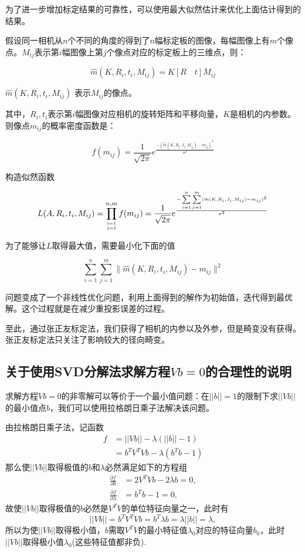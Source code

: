 \documentclass{lzureport}
\begin{document}
为了进一步增加标定结果的可靠性，可以使用最大似然估计来优化上面估计得到的结果。

假设同一相机从$n$个不同的角度的得到了$n$幅标定板的图像，每幅图像上有$m$个像点。$M_{ij}$表示第$i$幅图像上第$j$个像点对应的标定板上的三维点，则：

$$
\hat{m}(K,R_{i},t_{i},M_{ij})=K[R\quad t]M_{ij}
$$

$\hat{m}(K,R_{i},t_{i},M_{ij})$ 表示$M_{ij}$的像点。

其中，$R_{i},t_{i}$表示第$i$幅图像对应相机的旋转矩阵和平移向量，$K$是相机的内参数。则像点$m_{ij}$的概率密度函数是：

$$
f(m_{ij})=\frac{1}{\sqrt{2\pi}}e^{\frac{-(\hat{m}(K,R_i,J_i,M_{ij})-m_{ij})^2}{\sigma^2}}
$$

构造似然函数

$$
L(A,R_i,t_i,M_{ij})=\prod_{i=1\atop j=1}^{n,m}f(m_{ij})=\frac{1}{\sqrt{2\pi}}e^{\frac{-\sum\limits_{i=1}^n\sum\limits_{j=1}^m(\hat{m}(K,R_i,J_i,M_{ij})-m_{ij})^2}{\sigma^2}}
$$

为了能够让$L$取得最大值，需要最小化下面的值

$$
\sum_{i=1}^n\sum_{j=1}^m\|\hat{m}(K,R_i,t_i,M_{ij})-m_{ij}\|^2
$$

问题变成了一个非线性优化问题，利用上面得到的解作为初始值，迭代得到最优解。这个过程就是在减少重投影误差的过程。

至此，通过张正友标定法，我们获得了相机的内参以及外参，但是畸变没有获得。张正友标定法只关注了影响较大的径向畸变。

\subsection{关于使用SVD分解法求解方程$Vb=0$的合理性的说明}
求解方程$Vb=0$的非零解可以等价于一个最小值问题：在$||b||=1$的限制下求$||Vb||$的最小值点$b$，我们可以使用拉格朗日乘子法解决该问题。

由拉格朗日乘子法，记函数
\begin{equation*}
\begin{aligned}
	f&=||Vb||-\lambda(||b||-1)\\
	 &=b^TV^TVb-\lambda(b^Tb-1)
\end{aligned}
\end{equation*}
那么使$||Vb||$取得极值的$b$和$\lambda$必然满足如下的方程组
\begin{equation*}
	\begin{aligned}
		\frac{\partial f}{\partial b}&=2V^TVb-2\lambda b=0,\\
		\frac{\partial f}{\partial \lambda}&=b^Tb-1=0,
	\end{aligned}
\end{equation*}
故使$||Vb||$取得极值的$b$必然是$V^TV$的单位特征向量之一，此时有
$$
||Vb||=b^TV^TVb=b^T\lambda b=\lambda||b||=\lambda,
$$
所以为使$||Vb||$取得极小值，$b$需取$V^TV$的最小特征值$\lambda_0$对应的特征向量$b_0$，此时$||Vb||$取得极小值$\lambda_0$(这些特征值都非负).
\end{document}
